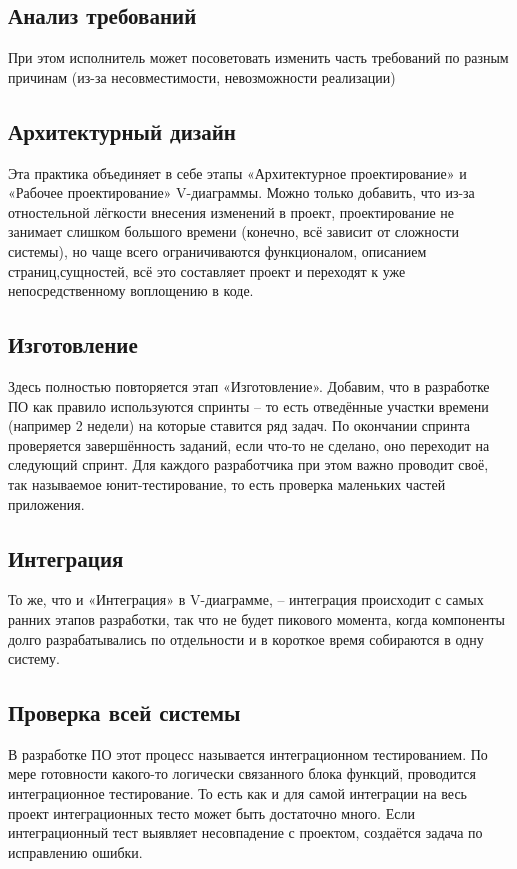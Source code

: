 \documentclass[bibliography=totocnumbered]{scrartcl}
\begin{document}
\subsection{Анализ требований}
При этом исполнитель может посоветовать изменить часть требований по разным причинам (из-за несовместимости, невозможности реализации)

\subsection{Архитектурный дизайн}
Эта практика объединяет в себе этапы «Архитектурное проектирование» и «Рабочее проектирование» V-диаграммы. Можно только добавить, что из-за отностельной лёгкости внесения изменений в проект, проектирование не занимает слишком большого времени (конечно, всё зависит от сложности системы), но чаще всего ограничиваются функционалом, описанием страниц,сущностей, всё это составляет проект и переходят к уже непосредственному воплощению в коде.

\subsection{Изготовление}
Здесь полностью повторяется этап «Изготовление». Добавим, что в разработке ПО как правило используются спринты -- то есть отведённые участки времени (например 2 недели) на которые ставится ряд задач. По окончании спринта проверяется завершённость заданий, если что-то не сделано, оно переходит на следующий спринт. Для каждого разработчика при этом важно проводит своё, так называемое юнит-тестирование, то есть проверка маленьких частей приложения.

\subsection{Интеграция}
То же, что и «Интеграция» в V-диаграмме, -- интеграция происходит с самых ранних этапов разработки, так что не будет пикового момента, когда компоненты долго разрабатывались по отдельности и в короткое время собираются в одну систему.

\subsection{Проверка всей системы}
В разработке ПО этот процесс называется интеграционном тестированием. По мере готовности какого-то логически связанного блока функций, проводится интеграционное тестирование. То есть как и для самой интеграции на весь проект интеграционных тесто может быть достаточно много. Если интеграционный тест выявляет несовпадение с проектом, создаётся задача по исправлению ошибки.
\end{document}
